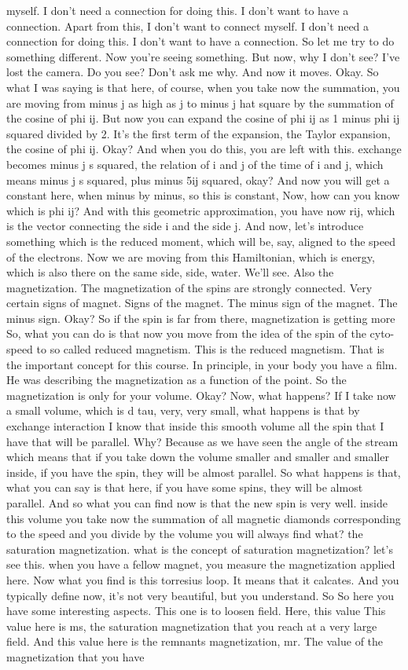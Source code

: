 myself. I don't need a connection for doing this. I don't want to have a connection. Apart from this, I don't want to connect myself. I don't need a connection for doing this. I don't want to have a connection. So let me try to do something different. Now you're seeing something. But now, why I don't see? I've lost the camera. Do you see? Don't ask me why. And now it moves. Okay. So what I was saying is that here, of course, when you take now the summation, you are moving from minus j as high as j to minus j hat square by the summation of the cosine of phi ij. But now you can expand the cosine of phi ij as 1 minus phi ij squared divided by 2. It's the first term of the expansion, the Taylor expansion, the cosine of phi ij. Okay? And when you do this, you are left with this. exchange becomes minus j s squared, the relation of i and j of the time of i and j, which means minus j s squared, plus minus 5ij squared, okay? And now you will get a constant here, when minus by minus, so this is constant, Now, how can you know which is phi ij? And with this geometric approximation, you have now rij, which is the vector connecting the side i and the side j. And now, let's introduce something which is the reduced moment, which will be, say, aligned to the speed of the electrons. Now we are moving from this Hamiltonian, which is energy, which is also there on the same side, side, water. We'll see. Also the magnetization. The magnetization of the spins are strongly connected. Very certain signs of magnet. Signs of the magnet. The minus sign of the magnet. The minus sign. Okay? So if the spin is far from there, magnetization is getting more So, what you can do is that now you move from the idea of the spin of the cyto-speed to so called reduced magnetism. This is the reduced magnetism. That is the important concept for this course. In principle, in your body you have a film. He was describing the magnetization as a function of the point. So the magnetization is only for your volume. Okay? Now, what happens? If I take now a small volume, which is d tau, very, very small, what happens is that by exchange interaction I know that inside this smooth volume all the spin that I have that will be parallel. Why? Because as we have seen the angle of the stream which means that if you take down the volume smaller and smaller and smaller inside, if you have the spin, they will be almost parallel. So what happens is that, what you can say is that here, if you have some spins, they will be almost parallel. And so what you can find now is that the new spin is very well. inside this volume you take now the summation of all magnetic diamonds corresponding to the speed and you divide by the volume you will always find what? the saturation magnetization. what is the concept of saturation magnetization? let's see this. when you have a fellow magnet, you measure the magnetization applied here. Now what you find is this torresius loop. It means that it calcates. And you typically define now, it's not very beautiful, but you understand. So So here you have some interesting aspects. This one is to loosen field. Here, this value This value here is ms, the saturation magnetization that you reach at a very large field. And this value here is the remnants magnetization, mr. The value of the magnetization that you have 